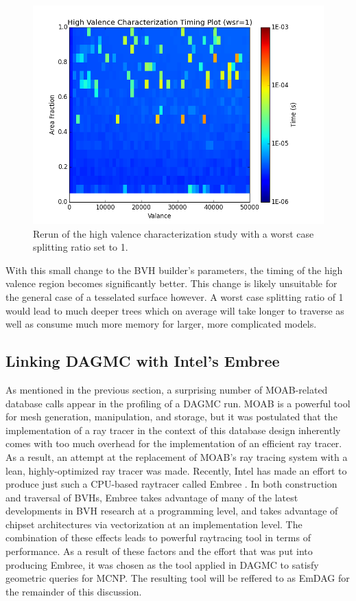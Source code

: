 \documentclass[12pt, a4paper]{article}
\begin{document}
  
\begin{figure}[H]
  \centering
    \includegraphics[scale=0.45]{hv_study_MOAB_wsr1.png}
    \caption{Rerun of the high valence characterization study with a worst case splitting ratio set to 1.}
\end{figure}


With this small change to the BVH builder's parameters, the timing of the high valence region becomes significantly better. This change is likely unsuitable for the general case of a tesselated surface however. A worst case splitting ratio of 1 would lead to much deeper trees which on average will take longer to traverse as well as consume much more memory for larger, more complicated models.

\subsection{Linking DAGMC with Intel's Embree}%
\label{emdag}

As mentioned in the previous section, a surprising number of MOAB-related database calls appear in the profiling of a DAGMC run. MOAB is a powerful tool for mesh generation, manipulation, and storage, but it was postulated that the implementation of a ray tracer in the context of this database design inherently comes with too much overhead for the implementation of an efficient ray tracer. As a result, an attempt at the replacement of MOAB's ray tracing system with a lean, highly-optimized ray tracer was made. Recently, Intel has made an effort to produce just such a CPU-based raytracer called Embree \cite{Wald_2014}. In both construction and traversal of BVHs, Embree takes advantage of many of the latest developments in BVH research at a programming level, and takes advantage of chipset architectures via vectorization at an implementation level. The combination of these effects leads to powerful raytracing tool in terms of performance. As a result of these factors and the effort that was put into producing Embree, it was chosen as the tool applied in DAGMC to satisfy geometric queries for MCNP. The resulting tool will be reffered to as EmDAG for the remainder of this discussion.
\end{document}
